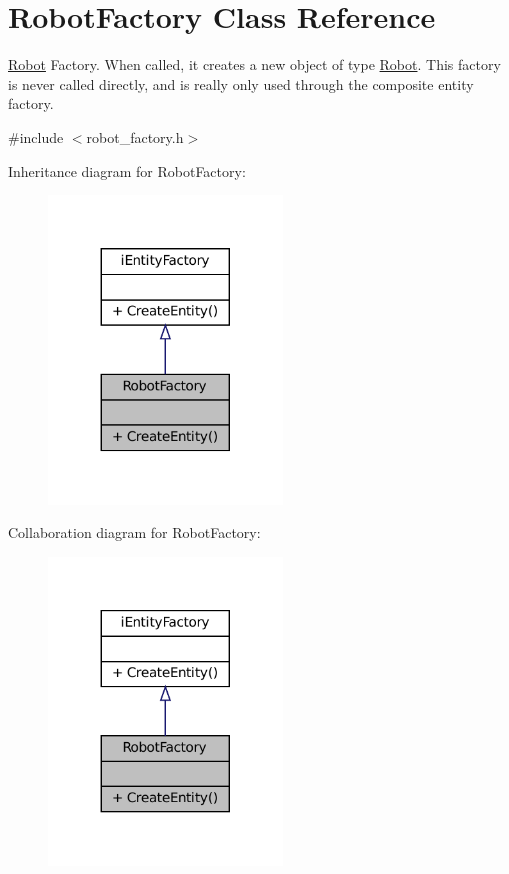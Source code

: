 \hypertarget{classRobotFactory}{}\section{Robot\+Factory Class Reference}
\label{classRobotFactory}


\hyperlink{classRobot}{Robot} Factory. When called, it creates a new object of type \hyperlink{classRobot}{Robot}. This factory is never called directly, and is really only used through the composite entity factory.  




{\ttfamily \#include $<$robot\+\_\+factory.\+h$>$}



Inheritance diagram for Robot\+Factory\+:\nopagebreak
\begin{figure}[H]
\begin{center}
\leavevmode
\includegraphics[width=176pt]{classRobotFactory__inherit__graph}
\end{center}
\end{figure}


Collaboration diagram for Robot\+Factory\+:\nopagebreak
\begin{figure}[H]
\begin{center}
\leavevmode
\includegraphics[width=176pt]{classRobotFactory__coll__graph}
\end{center}
\end{figure}
